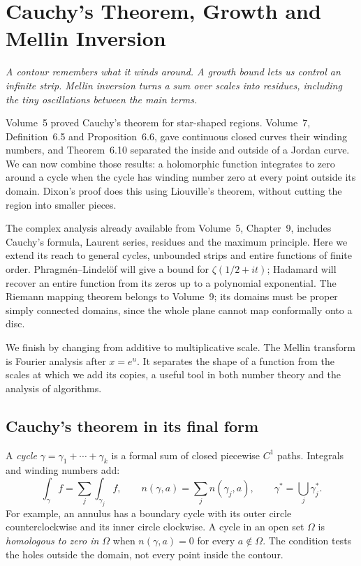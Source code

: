 \chapter{Cauchy's Theorem, Growth and Mellin Inversion}\label{ch:complex}

\begin{center}\itshape
A contour remembers what it winds around. A growth bound lets us control an infinite strip. Mellin inversion turns a sum over scales into residues, including the tiny oscillations between the main terms.
\end{center}

Volume~5 proved Cauchy's theorem for star-shaped regions. Volume~7, Definition~6.5 and Proposition~6.6, gave continuous closed curves their winding numbers, and Theorem~6.10 separated the inside and outside of a Jordan curve. We can now combine those results: a holomorphic function integrates to zero around a cycle when the cycle has winding number zero at every point outside its domain. Dixon's proof does this using Liouville's theorem, without cutting the region into smaller pieces.

The complex analysis already available from Volume~5, Chapter~9, includes Cauchy's formula, Laurent series, residues and the maximum principle. Here we extend its reach to general cycles, unbounded strips and entire functions of finite order. Phragm\'en--Lindel\"of will give a bound for $\zeta(1/2+it)$; Hadamard will recover an entire function from its zeros up to a polynomial exponential. The Riemann mapping theorem belongs to Volume~9; its domains must be proper simply connected domains, since the whole plane cannot map conformally onto a disc.

We finish by changing from additive to multiplicative scale. The Mellin transform is Fourier analysis after $x=e^u$. It separates the shape of a function from the scales at which we add its copies, a useful tool in both number theory and the analysis of algorithms.

\section{Cauchy's theorem in its final form}

A \emph{cycle} $\gamma=\gamma_1+\cdots+\gamma_k$ is a formal sum of closed piecewise $C^1$ paths. Integrals and winding numbers add:
\[\int_\gamma f=\sum_j\int_{\gamma_j}f,\qquad
 n(\gamma,a)=\sum_jn(\gamma_j,a),\qquad\gamma^*=\bigcup_j\gamma_j^*.
\]
For example, an annulus has a boundary cycle with its outer circle counterclockwise and its inner circle clockwise. A cycle in an open set $\Omega$ is \emph{homologous to zero in $\Omega$} when $n(\gamma,a)=0$ for every $a\notin\Omega$. The condition tests the holes outside the domain, not every point inside the contour.

